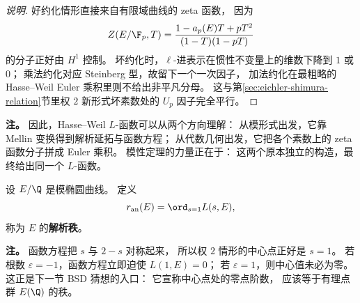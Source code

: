 \begin{proof}[说明]
好约化情形直接来自有限域曲线的 zeta 函数，
因为
\[
  Z(E/\F_p,T)=\frac{1-a_p(E)T+pT^2}{(1-T)(1-pT)}
\]
的分子正好由 $H^1$ 控制。
坏约化时，$\ell$-进表示在惯性不变量上的维数下降到 $1$ 或 $0$；
乘法约化对应 Steinberg 型，故留下一个一次因子，
加法约化在最粗略的 Hasse--Weil Euler 乘积里则不给出非平凡分母。
这与第\ref{sec:eichler-shimura-relation}节里权 $2$ 新形式坏素数处的 $U_p$ 因子完全平行。
\end{proof}

\textbf{注。}
因此，Hasse--Weil $L$-函数可以从两个方向理解：
从模形式出发，它靠 Mellin 变换得到解析延拓与函数方程；
从代数几何出发，它把各个素数上的 zeta 函数分子拼成 Euler 乘积。
模性定理的力量正在于：
这两个原本独立的构造，最终给出同一个 $L$-函数。

\begin{definition}[解析秩]
\label{def:ch08-analytic-rank}
设 $E/\Q$ 是模椭圆曲线。
定义
\[
  r_{\mathrm{an}}(E)=\ord_{s=1}L(s,E),
\]
称为 $E$ 的\textbf{解析秩}。
\end{definition}

\textbf{注。}
函数方程把 $s$ 与 $2-s$ 对称起来，
所以权 $2$ 情形的中心点正好是 $s=1$。
若根数 $\varepsilon=-1$，函数方程立即迫使 $L(1,E)=0$；
若 $\varepsilon=1$，则中心值未必为零。
这正是下一节 BSD 猜想的入口：
它宣称中心点处的零点阶数，
应该等于有理点群 $E(\Q)$ 的秩。
